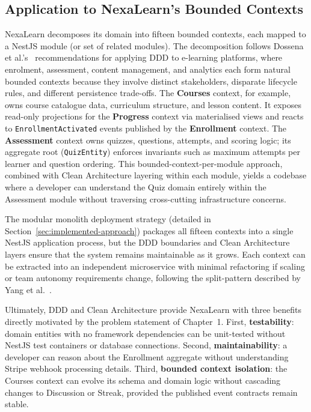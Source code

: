 \subsection{Application to NexaLearn's Bounded Contexts}

NexaLearn decomposes its domain into fifteen bounded contexts, each mapped to a NestJS module (or set of related modules). The decomposition follows Dossena et al.'s~\cite{dossena2022ddd} recommendations for applying DDD to e-learning platforms, where enrolment, assessment, content management, and analytics each form natural bounded contexts because they involve distinct stakeholders, disparate lifecycle rules, and different persistence trade-offs. The \textbf{Courses} context, for example, owns course catalogue data, curriculum structure, and lesson content. It exposes read-only projections for the \textbf{Progress} context via materialised views and reacts to \texttt{EnrollmentActivated} events published by the \textbf{Enrollment} context. The \textbf{Assessment} context owns quizzes, questions, attempts, and scoring logic; its aggregate root (\texttt{QuizEntity}) enforces invariants such as maximum attempts per learner and question ordering. This bounded-context-per-module approach, combined with Clean Architecture layering within each module, yields a codebase where a developer can understand the Quiz domain entirely within the Assessment module without traversing cross-cutting infrastructure concerns.

The modular monolith deployment strategy (detailed in Section~\ref{sec:implemented-approach}) packages all fifteen contexts into a single NestJS application process, but the DDD boundaries and Clean Architecture layers ensure that the system remains maintainable as it grows. Each context can be extracted into an independent microservice with minimal refactoring if scaling or team autonomy requirements change, following the split-pattern described by Yang et al.~\cite{yang2023micro}.

Ultimately, DDD and Clean Architecture provide NexaLearn with three benefits directly motivated by the problem statement of Chapter~1. First, \textbf{testability}: domain entities with no framework dependencies can be unit-tested without NestJS test containers or database connections. Second, \textbf{maintainability}: a developer can reason about the Enrollment aggregate without understanding Stripe webhook processing details. Third, \textbf{bounded context isolation}: the Courses context can evolve its schema and domain logic without cascading changes to Discussion or Streak, provided the published event contracts remain stable.

